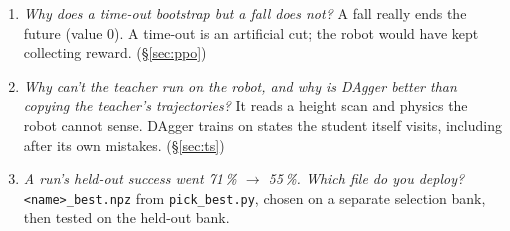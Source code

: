 \documentclass[10pt,letterpaper]{article}
\begin{document}
\begin{small}
\begin{enumerate}[leftmargin=1.5em]
\item \emph{Why does a time-out bootstrap but a fall does not?}
\textcolor{Ink2}{A fall really ends the future (value 0). A time-out is an artificial cut; the robot would have kept collecting reward. (§\ref{sec:ppo})}
\item \emph{Why can't the teacher run on the robot, and why is DAgger better than copying the teacher's trajectories?}
\textcolor{Ink2}{It reads a height scan and physics the robot cannot sense. DAgger trains on states the student itself visits, including after
its own mistakes. (§\ref{sec:ts})}
\item \emph{A run's held-out success went 71\,\% $\to$ 55\,\%. Which file do you deploy?}
\textcolor{Ink2}{\texttt{<name>\_best.npz} from \texttt{pick\_best.py}, chosen on a separate selection bank, then tested on the held-out bank.}
\end{enumerate}
\end{small}
\end{document}
